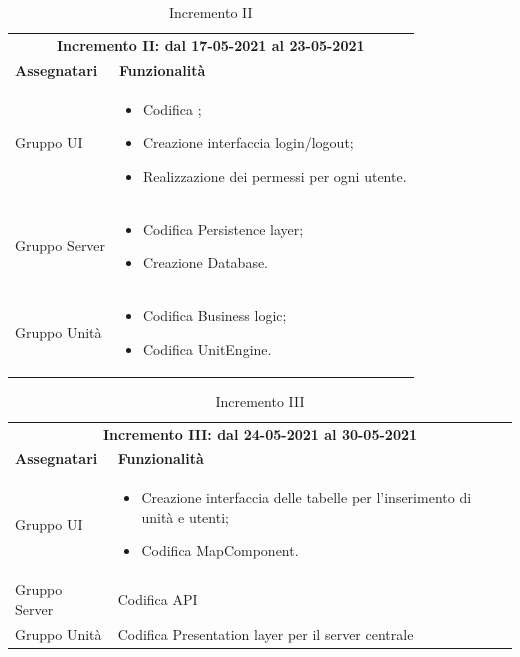  \begin{table} [h!]
 	\begin{center}
 		\begin{tabular} { m{4cm}  m{11cm}  }	
 			\multicolumn{2}{c}{	\textbf{Incremento II: dal 17-05-2021 al 23-05-2021}} \\
 			\rowcolor{lightgray}
 			\textbf{Assegnatari} & \textbf{Funzionalità} \\
 			Gruppo UI & \begin{itemize}
 				\item Codifica \glock{WebSocket};
 				\item Creazione interfaccia login/logout;
 				\item Realizzazione dei permessi per ogni utente.
 			\end{itemize}\\		
 			Gruppo Server & \begin{itemize}
 				\item Codifica Persistence layer;
 				\item Creazione Database.
 			\end{itemize}\\		
 			Gruppo Unità & \begin{itemize}
 				\item Codifica Business logic;
 				\item Codifica UnitEngine.
 			\end{itemize}\\		
 		\end{tabular}
 		\caption{Incremento II}
 	\end{center}
 \end{table}

 \begin{table} [h!]
	\begin{center}
		\begin{tabular} { m{4cm}  m{11cm}  }	
			\multicolumn{2}{c}{	\textbf{Incremento III: dal 24-05-2021 al 30-05-2021}} \\
			\rowcolor{lightgray}
			\textbf{Assegnatari} & \textbf{Funzionalità} \\
			Gruppo UI & \begin{itemize}
				\item Creazione interfaccia delle tabelle per l'inserimento di unità e utenti;
				\item Codifica MapComponent.
			\end{itemize}\\		
			Gruppo Server & Codifica API\\
			Gruppo Unità & Codifica Presentation layer per il server centrale
		
		\end{tabular}
		\caption{Incremento III}
	\end{center}
\end{table}


